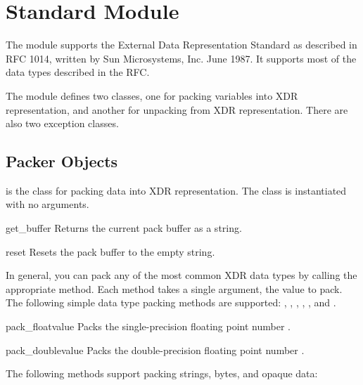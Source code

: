 \section{Standard Module }
\label{module-xdrlib}

\renewcommand{\indexsubitem}{(in module xdrlib)}


The  module supports the External Data Representation
Standard as described in RFC 1014, written by Sun Microsystems,
Inc. June 1987.  It supports most of the data types described in the
RFC.

The  module defines two classes, one for packing
variables into XDR representation, and another for unpacking from XDR
representation.  There are also two exception classes.


\subsection{Packer Objects}

 is the class for packing data into XDR representation.
The  class is instantiated with no arguments.

\begin{funcdesc}{get_buffer}{}
Returns the current pack buffer as a string.
\end{funcdesc}

\begin{funcdesc}{reset}{}
Resets the pack buffer to the empty string.
\end{funcdesc}

In general, you can pack any of the most common XDR data types by
calling the appropriate  method.  Each method
takes a single argument, the value to pack.  The following simple data
type packing methods are supported: , ,
, , ,
and .

\begin{funcdesc}{pack_float}{value}
Packs the single-precision floating point number .
\end{funcdesc}

\begin{funcdesc}{pack_double}{value}
Packs the double-precision floating point number .
\end{funcdesc}

The following methods support packing strings, bytes, and opaque data:


